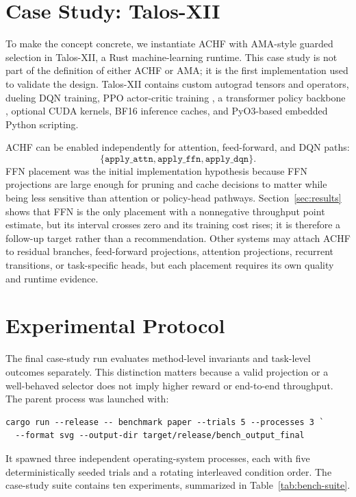 \documentclass{article}
\newcommand{\achf}{\textsc{ACHF}}
\newcommand{\ama}{\textsc{AMA}}
\begin{document}
\section{Case Study: Talos-XII}

To make the concept concrete, we instantiate ACHF with \ama{}-style guarded
selection in Talos-XII, a Rust machine-learning runtime. This case study is not
part of the definition of either \achf{} or \ama{}; it is the first
implementation used to validate the design. Talos-XII
contains custom autograd tensors and operators, dueling DQN training, PPO
actor-critic training \cite{schulman2017ppo}, a transformer policy backbone
\cite{vaswani2017attention}, optional CUDA kernels, BF16 inference caches, and
PyO3-based embedded Python scripting.

\achf{} can be enabled independently for attention, feed-forward, and DQN paths:
\begin{equation}
\{\texttt{apply\_attn},\texttt{apply\_ffn},\texttt{apply\_dqn}\}.
\end{equation}
FFN placement was the initial implementation hypothesis because FFN projections
are large enough for pruning and cache decisions to matter while being less
sensitive than attention or policy-head pathways. Section~\ref{sec:results}
shows that FFN is the only placement with a nonnegative throughput point
estimate, but its interval crosses zero and its training cost rises; it is
therefore a follow-up target rather than a recommendation. Other systems may
attach \achf{} to residual branches, feed-forward projections, attention
projections, recurrent transitions, or task-specific heads, but each placement
requires its own quality and runtime evidence.

\section{Experimental Protocol}
\label{sec:experiments}

The final case-study run evaluates method-level invariants and task-level
outcomes separately. This distinction matters because a valid projection or a
well-behaved selector does not imply higher reward or end-to-end throughput.
The parent process was launched with:
\begin{verbatim}
cargo run --release -- benchmark paper --trials 5 --processes 3 `
  --format svg --output-dir target/release/bench_output_final
\end{verbatim}
It spawned three independent operating-system processes, each with five
deterministically seeded trials and a rotating interleaved condition order.
The case-study suite contains ten experiments, summarized in
Table~\ref{tab:bench-suite}.
\end{document}
